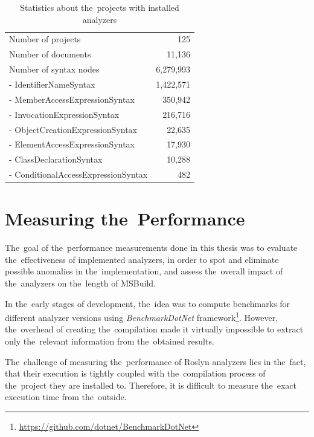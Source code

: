 \documentclass[
  digital, %
  table,   %
  lof,     %
  lot,     %
  oneside,
]{fithesis3}
\begin{document}
\begin{table}
\begin{tabularx}{\textwidth}{Xr}
\toprule
Number of projects                  & 125 \\
Number of documents              & 11,136 \\
Number of syntax nodes        & 6,279,993 \\
- IdentifierNameSyntax        & 1,422,571 \\
- MemberAccessExpressionSyntax  & 350,942 \\
- InvocationExpressionSyntax     & 216,716 \\
- ObjectCreationExpressionSyntax & 22,635 \\ 
- ElementAccessExpressionSyntax  & 17,930 \\
- ClassDeclarationSyntax         & 10,288 \\ 
- ConditionalAccessExpressionSyntax & 482 \\

\bottomrule

\end{tabularx}
\caption{Statistics about the~projects with installed analyzers}
\label{tab:solution-statistics}
\end{table}

\section{Measuring the~Performance}
\label{sec:measuring-performance}
The~goal of the~performance measurements done in this thesis was to evaluate the~effectiveness of implemented analyzers, in order to spot and eliminate possible anomalies in the~implementation, and assess the~overall impact of the~analyzers on the~length of MSBuild.

In the~early stages of development, the~idea was to compute benchmarks for different analyzer versions using \textit{BenchmarkDotNet} framework\footnote{\url{https://github.com/dotnet/BenchmarkDotNet}}. However, the~overhead of creating the~compilation made it virtually impossible to extract only the~relevant information from the~obtained results.

The~challenge of measuring the~performance of Roslyn analyzers lies in the~fact, that their execution is tightly coupled with the~compilation process of the~project they are installed to. Therefore, it is difficult to measure the~exact execution time from the~outside. 
\end{document}
